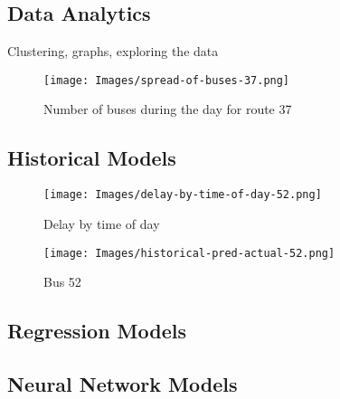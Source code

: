 \documentclass[12pt, a4paper]{article}
\begin{document}
\subsection{Data Analytics}

Clustering, graphs, exploring the data

\begin{figure}[H]
\begin{center}
    \texttt{[image: Images/spread-of-buses-37.png]}
    \caption{Number of buses during the day for route 37}
    \label{fig:spread-of-buses-over-day}
\end{center}
\end{figure}

\subsection{Historical Models}

\begin{figure}[H]
\begin{center}
    \texttt{[image: Images/delay-by-time-of-day-52.png]}
    \caption{Delay by time of day}
    \label{fig:databases}
\end{center}
\end{figure}

\begin{figure}[H]
\begin{center}
    \texttt{[image: Images/historical-pred-actual-52.png]}
    \caption{Bus 52}
    \label{fig:historical-pred-actual}
\end{center}
\end{figure}

\subsection{Regression Models}

\subsection{Neural Network Models}

\clearpage
\end{document}
